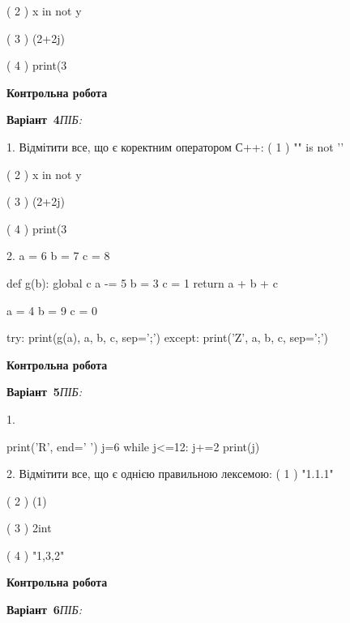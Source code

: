 \documentclass[11pt]{article}
\begin{document}
( 2 ) x in not y

( 3 ) (2+2j)%

( 4 ) print(3%



\newpage

\newpage

{\large\textbf{Контрольна робота}}

\textbf{Варіант \No\,4}\hfill \textit{ПІБ:}\,\underline{\hspace{60mm}}
\vspace{4mm}

1. %
Відмітити все, що є коректним оператором С++:
( 1 ) "\n" is not '\n'

( 2 ) x in not y

( 3 ) (2+2j)%

( 4 ) print(3%

2. 
a = 6
b = 7
c = 8

def g(b):
global c    a -= 5
    b = 3
    c = 1
    return a + b + c

a = 4
b = 9
c = 0

try:
    print(g(a), a, b, c, sep=';')
except:
    print('Z', a, b, c, sep=';')



\newpage

\newpage

{\large\textbf{Контрольна робота}}

\textbf{Варіант \No\,5}\hfill \textit{ПІБ:}\,\underline{\hspace{60mm}}
\vspace{4mm}

1. 

print('R', end=' ')
j=6
while j<=12:
    j+=2
print(j)


2. %
Відмітити все, що є однією правильною лексемою:
( 1 ) "1.1.1"

( 2 ) (1)

( 3 ) 2int

( 4 ) "1,3,2"



\newpage

\newpage

{\large\textbf{Контрольна робота}}

\textbf{Варіант \No\,6}\hfill \textit{ПІБ:}\,\underline{\hspace{60mm}}
\vspace{4mm}
\end{document}
